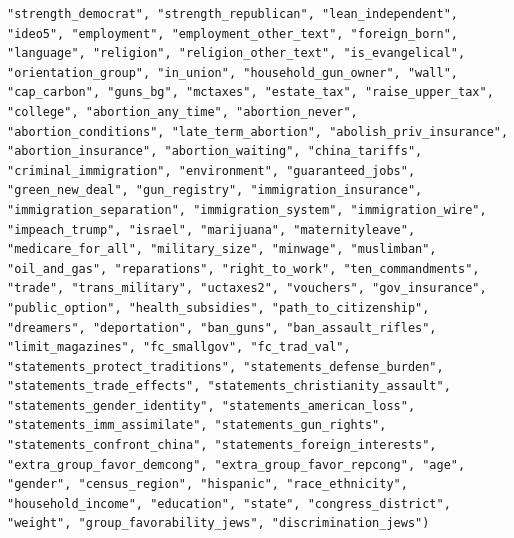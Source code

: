 \documentclass[
]{article}
\begin{document}
\begin{verbatim}
"strength_democrat", "strength_republican", "lean_independent", "ideo5", "employment", "employment_other_text", "foreign_born", "language", "religion", "religion_other_text", "is_evangelical", "orientation_group", "in_union", "household_gun_owner", "wall", "cap_carbon", "guns_bg", "mctaxes", "estate_tax", "raise_upper_tax", "college", "abortion_any_time", "abortion_never", "abortion_conditions", "late_term_abortion", "abolish_priv_insurance", "abortion_insurance", "abortion_waiting", "china_tariffs", "criminal_immigration", "environment", "guaranteed_jobs", "green_new_deal", "gun_registry", "immigration_insurance", "immigration_separation", "immigration_system", "immigration_wire", "impeach_trump", "israel", "marijuana", "maternityleave", "medicare_for_all", "military_size", "minwage", "muslimban", "oil_and_gas", "reparations", "right_to_work", "ten_commandments", "trade", "trans_military", "uctaxes2", "vouchers", "gov_insurance", "public_option", "health_subsidies", "path_to_citizenship", "dreamers", "deportation", "ban_guns", "ban_assault_rifles", "limit_magazines", "fc_smallgov", "fc_trad_val", "statements_protect_traditions", "statements_defense_burden", "statements_trade_effects", "statements_christianity_assault", "statements_gender_identity", "statements_american_loss", "statements_imm_assimilate", "statements_gun_rights", "statements_confront_china", "statements_foreign_interests", "extra_group_favor_demcong", "extra_group_favor_repcong", "age", "gender", "census_region", "hispanic", "race_ethnicity", "household_income", "education", "state", "congress_district", "weight", "group_favorability_jews", "discrimination_jews")

\end{verbatim}
\end{document}
